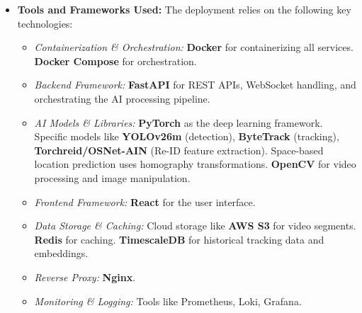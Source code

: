 \begin{itemize}
    \item \textbf{Tools and Frameworks Used:}
        The deployment relies on the following key technologies:
        \begin{itemize}
            \item \textit{Containerization \& Orchestration:} \textbf{Docker} for containerizing all services.  \textbf{Docker Compose} for orchestration.
            \item \textit{Backend Framework:} \textbf{FastAPI} for REST APIs, WebSocket handling, and orchestrating the AI processing pipeline.
            \item \textit{AI Models \& Libraries:} \textbf{PyTorch} as the deep learning framework. Specific models like \textbf{YOLOv26m} (detection), \textbf{ByteTrack} (tracking), \textbf{Torchreid/OSNet-AIN} (Re-ID feature extraction). Space-based location prediction uses homography transformations. \textbf{OpenCV} for video processing and image manipulation.
            \item \textit{Frontend Framework:} \textbf{React} for the user interface.
            \item \textit{Data Storage \& Caching:} Cloud storage like \textbf{AWS S3} for video segments. \textbf{Redis} for caching. \textbf{TimescaleDB} for historical tracking data and embeddings.
            \item \textit{Reverse Proxy:} \textbf{Nginx}.
            \item \textit{Monitoring \& Logging:} Tools like Prometheus, Loki, Grafana.
        \end{itemize}


\end{itemize}
